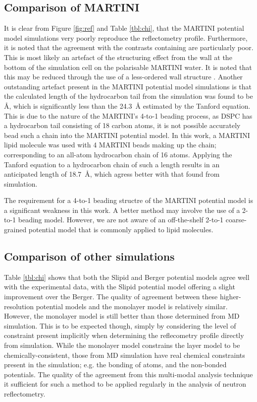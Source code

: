 \documentclass[amsmath,amssymb,twocolumn,superscriptaddress]{revtex4-1}
\begin{document}
\subsection{Comparison of MARTINI}
It is clear from Figure \ref{fig:ref} and Table \ref{tbl:chi}, that the MARTINI potential model simulations very poorly reproduce the reflectometry profile.
Furthermore, it is noted that the agreement with the contrasts containing  are particularly poor.
This is most likely an artefact of the structuring effect from the wall at the bottom of the simulation cell on the polarisable MARTINI water.
It is noted that this may be reduced through the use of a less-ordered wall structure \cite{Koutsioubas2016}.
Another outstanding artefact present in the MARTINI potential model simulations is that the calculated length of the hydrocarbon tail from the simulation was found to be \si{\angstrom}, which is significantly less than the \SI{24.3}{\angstrom} estimated by the Tanford equation.
This is due to the nature of the MARTINI's 4-to-1 beading process, as DSPC has a hydrocarbon tail consisting of 18 carbon atoms, it is not possible accurately bead such a chain into the MARTINI potential model.
In this work, a MARTINI lipid molecule was used with 4 MARTINI beads making up the chain; corresponding to an all-atom hydrocarbon chain of 16 atoms.
Applying the Tanford equation to a hydrocarbon chain of such a length results in an anticipated length of \SI{18.7}{\angstrom}, which agress better with that found from simulation.

The requirement for a 4-to-1 beading structre of the MARTINI potential model is a significant weakness in this work.
A better method may involve the use of a 2-to-1 beading model.
However, we are not aware of an off-the-shelf 2-to-1 coarse-grained potential model that is commonly applied to lipid molecules.

\subsection{Comparison of other simulations}
Table \ref{tbl:chi} shows that both the Slipid and Berger potential models agree well with the experimental data, with the Slipid potential model offering a slight improvement over the Berger.
The quality of agreement between these higher-resolution potential models and the monolayer model is relatively similar.
However, the monolayer model is still better than those determined from MD simulation.
This is to be expected though, simply by considering the level of constraint present implicitly when determining the reflecometry profile directly from simulation.
While the monolayer model constrains the layer model to be chemically-consistent, those from MD simulation have real chemical constraints present in the simulation; e.g. the bonding of atoms, and the non-bonded potentials.
The quality of the agreement from this multi-modal analysis technique it sufficient for such a method to be applied regularly in the analysis of neutron reflectometry.
\end{document}
